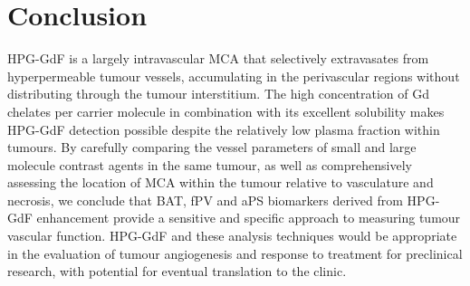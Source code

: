 \section{Conclusion}

HPG-GdF is a largely intravascular MCA that selectively extravasates from hyperpermeable tumour vessels, accumulating in the perivascular regions without distributing through the tumour interstitium.
The high concentration of Gd chelates per carrier molecule in combination with its excellent solubility makes HPG-GdF detection possible despite the relatively low plasma fraction within tumours.
By carefully comparing the vessel parameters of small and large molecule contrast agents in the same tumour, as well as comprehensively assessing the location of MCA within the tumour relative to vasculature and necrosis, we conclude that BAT, fPV and aPS biomarkers derived from HPG-GdF enhancement provide a sensitive and specific approach to measuring tumour vascular function.
HPG-GdF and these analysis techniques would be appropriate in the evaluation of tumour angiogenesis and response to treatment for preclinical research, with potential for eventual translation to the clinic.

\endinput

